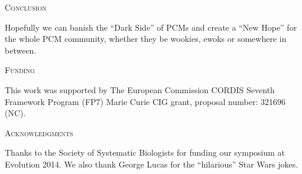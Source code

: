 \documentclass[a4paper,12pt]{article}
\renewcommand{\section}[1]{
  \bigskip
  \begin{center}
  \begin{Large}
  \normalfont\scshape #1
  \medskip
  \end{Large}
  \end{center}
}
\begin{document}
\section{Conclusion}

Hopefully we can banish the ``Dark Side'' of PCMs and create a ``New Hope'' for the whole PCM community, whether they be wookies, ewoks or somewhere in between.

\section{Funding}
This work was supported by The European Commission CORDIS Seventh Framework Program (FP7) Marie Curie CIG grant, proposal number: 321696 (NC). 

\section{Acknowledgments}
Thanks to the Society of Systematic Biologists for funding our symposium at Evolution 2014. 
We also thank George Lucas for the ``hilarious'' Star Wars jokes.



\end{document}

